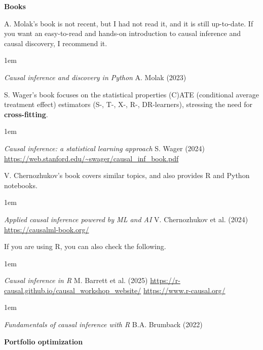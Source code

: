 \documentclass[a5paper]{article}
\let\d\textbf
\newenvironment{reference}{%
  \medskip\goodbreak
  \parskip 0pt
  \raggedright
  \leftskip 1em
  \obeylines
}{\par\medskip\goodbreak}
\def\section#1{\clearpage{\vspace*{0cm}\LARGE\centering\bfseries #1\par\bigskip\bigskip}}
\def\subsection#1{{\par\bigskip\goodbreak\large\bfseries #1\par}}
\begin{document}
\subsection{Books}

A. Molak's book is not recent, but I had not read it, and it is still up-to-date.
If you want an easy-to-read and hands-on introduction to causal inference and causal discovery,
I recommend it.

\begin{reference}
  \emph{Causal inference and discovery in Python}
  A. Molak (2023)
\end{reference}

S. Wager's book focuses on the statistical properties (C)ATE (conditional average treatment effect) estimators
(S-, T-, X-, R-, DR-learners), stressing the need for \d{cross-fitting}.

\begin{reference}
  \emph{Causal inference:  a statistical learning approach}
  S. Wager (2024)
  \url{https://web.stanford.edu/~swager/causal_inf_book.pdf}
\end{reference}

V. Chernozhukov's book covers similar topics, and also provides R and Python notebooks.

\begin{reference}
  \emph{Applied causal inference  powered by ML and AI}
  V. Chernozhukov et al. (2024)
  \url{https://causalml-book.org/}
\end{reference}

If you are using R, you can also check the following.

\begin{reference}
  \emph{Causal inference in R}
  M. Barrett et al. (2025)
  \url{https://r-causal.github.io/causal_workshop_website/}
  \url{https://www.r-causal.org/}
\end{reference}

\begin{reference}
  \emph{Fundamentals of causal inference with R}
  B.A. Brumback (2022)
\end{reference}

\section{Finance}
\subsection{Portfolio optimization}
\end{document}
